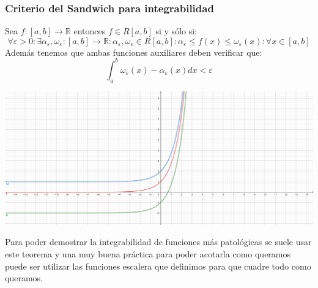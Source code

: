 \documentclass[10pt,a4paper,openright]{book}
\begin{document}
\subsubsection*{Criterio del Sandwich para integrabilidad}
Sea $f:[a,b]\rightarrow \mathbb R$ entonces $f\in R[a,b]$ si y sólo si:
$$\forall \varepsilon >0 : \exists \alpha_\varepsilon, \omega_\varepsilon: [a,b]\rightarrow \mathbb R : \alpha_\varepsilon, \omega_\varepsilon \in R[a,b]: \alpha_\varepsilon \leq f(x)\leq \omega_\varepsilon (x): \forall x\in [a,b]$$
Además tenemos que ambas funciones auxiliares deben verificar que:
$$\int_{a}^{b} \omega_\varepsilon(x)-\alpha_\varepsilon(x) dx < \varepsilon$$
\begin{center}
\includegraphics[scale=0.45]{criterio sandwich para integrales}
\end{center}

Para poder demostrar la integrabilidad de funciones más patológicas se suele usar este teorema y una muy buena práctica para poder acotarla como queramos puede ser utilizar las funciones escalera que definimos para que cuadre todo como queramos.
\end{document}
